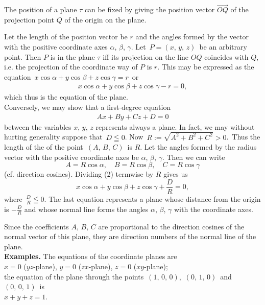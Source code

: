 \documentclass[12pt]{article}
\theoremstyle{definition}
\begin{document}
 
The position of a plane $\tau$ can be fixed by giving the position vector $\overrightarrow{OQ}$ of the projection point $Q$ of the origin on the plane.

Let the length of the position vector be $r$ and the angles formed by the vector with the positive coordinate axes $\alpha$, $\beta$, $\gamma$.  Let\, $P = (x,\,y,\,z)$\, be an arbitrary point.  Then $P$ is in the plane $\tau$ iff its projection on the line $OQ$ coincides with $Q$, i.e.  the projection of the coordinate way of $P$ is $r$.  This may be expressed as the equation \,$x\cos\alpha+y\cos\beta+z\cos\gamma = r$\, or
\begin{align}
     x\cos\alpha+y\cos\beta+z\cos\gamma-r = 0,
\end{align}
which thus is the equation of the plane.\\

Conversely, we may show that a first-degree equation
\begin{align}
             Ax+By+Cz+D = 0
\end{align}
between the variables $x$, $y$, $z$ represents always a plane.  In fact, we may without hurting generality suppose that\, $D \leqq 0$. Now\, $R := \sqrt{A^2+B^2+C^2} > 0$.\, Thus the length of the  of the point\, $(A,\,B,\,C)$\, is $R$.  Let the angles formed by the radius vector with the positive coordinate axes be $\alpha$, $\beta$, $\gamma$.  Then we can write
$$A = R\cos\alpha, \quad B = R\cos\beta, \quad C = R\cos\gamma$$
(cf. direction cosines).  Dividing (2) termwise by $R$ gives us
$$x\cos\alpha+y\cos\beta+z\cos\gamma+\frac{D}{R} = 0,$$
where\, $\frac{D}{R} \leqq 0$.  The last equation represents a plane whose distance from the origin is $-\frac{D}{R}$ and whose normal line forms the angles  $\alpha$, $\beta$, $\gamma$ with the coordinate axes.

Since the coefficients $A,\,B,\,C$ are proportional to the direction cosines of the normal vector of this plane, they are direction numbers of the normal line of the plane.\\

\textbf{Examples.}  The equations of the coordinate planes are\\
$x = 0$ ($yz$-plane),\; $y = 0$ ($zx$-plane),\; $z = 0$ ($xy$-plane);\\ 
the equation of the plane through the points\, $(1,\,0,\,0)$,\, $(0,\,1,\,0)$\, and\, $(0,\,0,\,1)$\, is\\
$x+y+z = 1$.\\
\end{document}
